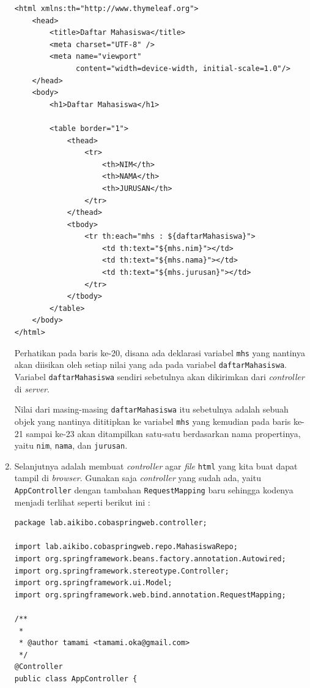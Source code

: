 \begin{enumerate}
	\begin{lstlisting}
<html xmlns:th="http://www.thymeleaf.org">
    <head>
        <title>Daftar Mahasiswa</title>
        <meta charset="UTF-8" />
        <meta name="viewport" 
              content="width=device-width, initial-scale=1.0"/>
    </head>
    <body>
        <h1>Daftar Mahasiswa</h1>
        
        <table border="1">
            <thead>
                <tr>
                    <th>NIM</th>
                    <th>NAMA</th>
                    <th>JURUSAN</th>
                </tr>
            </thead>
            <tbody>
                <tr th:each="mhs : ${daftarMahasiswa}">
                    <td th:text="${mhs.nim}"></td>
                    <td th:text="${mhs.nama}"></td>
                    <td th:text="${mhs.jurusan}"></td>
                </tr>
            </tbody>
        </table>
    </body>
</html>
	\end{lstlisting}	
	
	Perhatikan pada baris ke-20, disana ada deklarasi variabel \texttt{mhs} yang nantinya akan diisikan oleh setiap nilai yang ada pada variabel \texttt{daftarMahasiswa}. Variabel \texttt{daftarMahasiswa} sendiri sebetulnya akan dikirimkan dari \textit{controller} di \textit{server}.
	
	Nilai dari masing-masing \texttt{daftarMahasiswa} itu sebetulnya adalah sebuah objek yang nantinya dititipkan ke variabel \texttt{mhs} yang kemudian pada baris ke-21 sampai ke-23 akan ditampilkan satu-satu berdasarkan nama propertinya, yaitu \texttt{nim}, \texttt{nama}, dan \texttt{jurusan}.
	
	\item Selanjutnya adalah membuat \textit{controller} agar \textit{file} \texttt{html} yang kita buat dapat tampil di \textit{browser}. Gunakan saja \textit{controller} yang sudah ada, yaitu \texttt{AppController} dengan tambahan \texttt{RequestMapping} baru sehingga kodenya menjadi terlihat seperti berikut ini :
	
	\begin{lstlisting}
package lab.aikibo.cobaspringweb.controller;

import lab.aikibo.cobaspringweb.repo.MahasiswaRepo;
import org.springframework.beans.factory.annotation.Autowired;
import org.springframework.stereotype.Controller;
import org.springframework.ui.Model;
import org.springframework.web.bind.annotation.RequestMapping;

/**
 *
 * @author tamami <tamami.oka@gmail.com>
 */
@Controller
public class AppController {
    

\end{lstlisting}
\end{enumerate}
